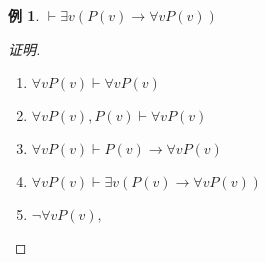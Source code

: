 \documentclass{article}
\newtheorem*{Example}{例}
\begin{document}
\begin{CJK*}{UTF8}{gbsn}
\begin{Example}
$\vdash \exists v(P(v)\to \forall v P(v))$
\end{Example}
\begin{proof}[证明]
  
  
  $\quad$

\begin{enumerate}
  \item $\forall v P(v)\vdash \forall v P(v)$
  \item $\forall v P(v), P(v)\vdash \forall v P(v)$
  \item $\forall v P(v) \vdash P(v) \to \forall v P(v)$
  \item $\forall v P(v) \vdash \exists v (P(v) \to \forall v P(v))$
  \item $\lnot \forall v P(v), $
\end{enumerate}
\end{proof}
\end{CJK*}
\end{document}
